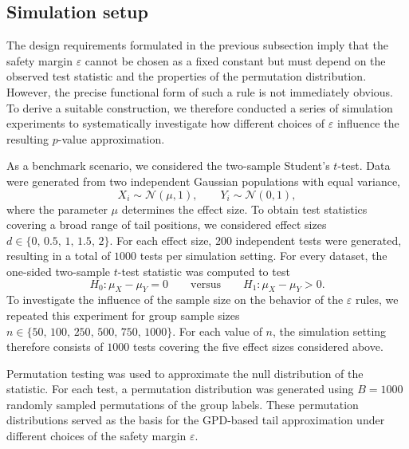 \subsection{Simulation setup}
\label{sec:6perm:epsilon:sim_setup}

The design requirements formulated in the previous subsection imply that the safety margin $\varepsilon$ cannot be chosen as a fixed constant but must depend on the observed test statistic and the properties of the permutation distribution. 
However, the precise functional form of such a rule is not immediately obvious. To derive a suitable construction, we therefore conducted a series of simulation experiments to systematically investigate how different choices of $\varepsilon$ influence the resulting $p$-value approximation.

As a benchmark scenario, we considered the two-sample Student's $t$-test. 
Data were generated from two independent Gaussian populations with equal variance,
\begin{equation}
    X_i \sim \mathcal{N}(\mu,1), \qquad Y_i \sim \mathcal{N}(0,1),
\end{equation}
where the parameter $\mu$ determines the effect size. 
To obtain test statistics covering a broad range of tail positions, we considered effect sizes $d \in \{0,\,0.5,\,1,\,1.5,\,2\}$.
For each effect size, $200$ independent tests were generated, resulting in a total of $1000$ tests per simulation setting. 
For every dataset, the one-sided two-sample $t$-test statistic was computed to test
\begin{equation}
    H_0:\mu_X - \mu_Y = 0 
    \qquad \text{versus} \qquad 
    H_1:\mu_X - \mu_Y > 0 .
\end{equation}
To investigate the influence of the sample size on the behavior of the $\varepsilon$ rules, we repeated this experiment for group sample sizes $n \in \{50,\,100,\,250,\,500,\,750,\,1000\}$.
For each value of $n$, the simulation setting therefore consists of $1000$ tests covering the five effect sizes considered above.

Permutation testing was used to approximate the null distribution of the statistic. 
For each test, a permutation distribution was generated using $B=1000$ randomly sampled permutations of the group labels. 
These permutation distributions served as the basis for the GPD-based tail approximation under different choices of the safety margin $\varepsilon$.

